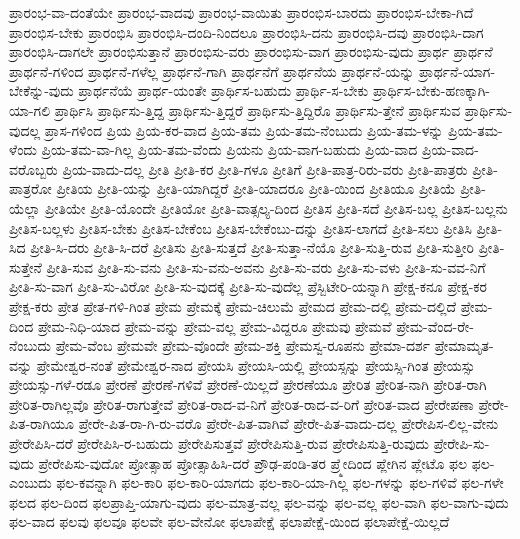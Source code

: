{ಪ್ರಾರಂಭ-ವಾ-ದಂತೆಯೇ
ಪ್ರಾರಂಭ-ವಾದವು
ಪ್ರಾರಂಭ-ವಾಯಿತು
ಪ್ರಾರಂಭಿಸ-ಬಾರದು
ಪ್ರಾರಂಭಿಸ-ಬೇಕಾ-ಗಿದೆ
ಪ್ರಾರಂಭಿಸ-ಬೇಕು
ಪ್ರಾರಂಭಿಸಿ
ಪ್ರಾರಂಭಿಸಿ-ದಂದಿ-ನಿಂದಲೂ
ಪ್ರಾರಂಭಿಸಿ-ದನು
ಪ್ರಾರಂಭಿಸಿ-ದವು
ಪ್ರಾರಂಭಿಸಿ-ದಾಗ
ಪ್ರಾರಂಭಿಸಿ-ದಾಗಲೇ
ಪ್ರಾರಂಭಿಸುತ್ತಾನೆ
ಪ್ರಾರಂಭಿಸು-ವರು
ಪ್ರಾರಂಭಿಸು-ವಾಗ
ಪ್ರಾರಂಭಿಸು-ವುದು
ಪ್ರಾರ್ಥ
ಪ್ರಾರ್ಥನೆ
ಪ್ರಾರ್ಥನೆ-ಗಳಿಂದ
ಪ್ರಾರ್ಥನೆ-ಗಳೆಲ್ಲ
ಪ್ರಾರ್ಥನೆ-ಗಾಗಿ
ಪ್ರಾರ್ಥನೆಗೆ
ಪ್ರಾರ್ಥನೆಯ
ಪ್ರಾರ್ಥನೆ-ಯನ್ನು
ಪ್ರಾರ್ಥನೆ-ಯಾಗ-ಬೇಕೆನ್ನು-ವುದು
ಪ್ರಾರ್ಥನೆಯೆ
ಪ್ರಾರ್ಥ-ಯಂತೇ
ಪ್ರಾರ್ಥಿಸ-ಬಹುದು
ಪ್ರಾರ್ಥಿ-ಸ-ಬೇಕು
ಪ್ರಾರ್ಥಿಸ-ಬೇಕು-ಹಣಕ್ಕಾಗಿ-ಯಾ-ಗಲಿ
ಪ್ರಾರ್ಥಿಸಿ
ಪ್ರಾರ್ಥಿಸು-ತ್ತಿದ್ದ
ಪ್ರಾರ್ಥಿಸು-ತ್ತಿದ್ದರೆ
ಪ್ರಾರ್ಥಿಸು-ತ್ತಿದ್ದಿರೊ
ಪ್ರಾರ್ಥಿಸು-ತ್ತೇನೆ
ಪ್ರಾರ್ಥಿಸುವ
ಪ್ರಾರ್ಥಿಸು-ವುದಲ್ಲ
ಪ್ರಾಸ-ಗಳಿಂದ
ಪ್ರಿಯ
ಪ್ರಿಯ-ಕರ-ವಾದ
ಪ್ರಿಯ-ತಮ
ಪ್ರಿಯ-ತಮ-ನೆಂಬುದು
ಪ್ರಿಯ-ತಮ-ಳನ್ನು
ಪ್ರಿಯ-ತಮ-ಳೆಂದು
ಪ್ರಿಯ-ತಮ-ವಾ-ಗಿಲ್ಲ
ಪ್ರಿಯ-ತಮ-ವೆಂದು
ಪ್ರಿಯನು
ಪ್ರಿಯ-ವಾಗ-ಬಹುದು
ಪ್ರಿಯ-ವಾದ
ಪ್ರಿಯ-ವಾದ-ವರೊಬ್ಬರು
ಪ್ರಿಯ-ವಾದು-ದಲ್ಲ
ಪ್ರೀತಿ
ಪ್ರೀತಿ-ಕರ
ಪ್ರೀತಿ-ಗಳೂ
ಪ್ರೀತಿಗೆ
ಪ್ರೀತಿ-ಪಾತ್ರ-ರಿರು-ವರು
ಪ್ರೀತಿ-ಪಾತ್ರರು
ಪ್ರೀತಿ-ಪಾತ್ರರೋ
ಪ್ರೀತಿಯ
ಪ್ರೀತಿ-ಯನ್ನು
ಪ್ರೀತಿ-ಯಾಗಿದ್ದರೆ
ಪ್ರೀತಿ-ಯಾದರೂ
ಪ್ರೀತಿ-ಯಿಂದ
ಪ್ರೀತಿಯೂ
ಪ್ರೀತಿಯೆ
ಪ್ರೀತಿ-ಯೆಲ್ಲಾ
ಪ್ರೀತಿಯೇ
ಪ್ರೀತಿ-ಯೊಂದೇ
ಪ್ರೀತಿಯೋ
ಪ್ರೀತಿ-ವಾತ್ಸಲ್ಯ-ದಿಂದ
ಪ್ರೀತಿಸ
ಪ್ರೀತಿ-ಸದೆ
ಪ್ರೀತಿಸ-ಬಲ್ಲ
ಪ್ರೀತಿಸ-ಬಲ್ಲನು
ಪ್ರೀತಿಸ-ಬಲ್ಲಳು
ಪ್ರೀತಿಸ-ಬೇಕು
ಪ್ರೀತಿಸ-ಬೇಕೆಂಬ
ಪ್ರೀತಿಸ-ಬೇಕೆಂಬು-ದನ್ನು
ಪ್ರೀತಿಸ-ಲಾಗದೆ
ಪ್ರೀತಿ-ಸಲು
ಪ್ರೀತಿಸಿ
ಪ್ರೀತಿ-ಸಿದ
ಪ್ರೀತಿ-ಸಿ-ದರು
ಪ್ರೀತಿ-ಸಿ-ದರೆ
ಪ್ರೀತಿಸು
ಪ್ರೀತಿ-ಸುತ್ತದೆ
ಪ್ರೀತಿ-ಸುತ್ತಾ-ನೆಯೊ
ಪ್ರೀತಿ-ಸುತ್ತಿ-ರುವ
ಪ್ರೀತಿ-ಸುತ್ತೀರಿ
ಪ್ರೀತಿ-ಸುತ್ತೇನೆ
ಪ್ರೀತಿ-ಸುವ
ಪ್ರೀತಿ-ಸು-ವನು
ಪ್ರೀತಿ-ಸು-ವನು-ಅವನು
ಪ್ರೀತಿ-ಸು-ವರು
ಪ್ರೀತಿ-ಸು-ವಳು
ಪ್ರೀತಿ-ಸು-ವವ-ನಿಗೆ
ಪ್ರೀತಿ-ಸು-ವಾಗ
ಪ್ರೀತಿ-ಸು-ವಿರೋ
ಪ್ರೀತಿ-ಸು-ವುದಕ್ಕೆ
ಪ್ರೀತಿ-ಸು-ವುದೆಲ್ಲ
ಪ್ರೆಸ್ಬಿಟೇರಿ-ಯನ್ನಾಗಿ
ಪ್ರೇಕ್ಷ-ಕನೂ
ಪ್ರೇಕ್ಷ-ಕರ
ಪ್ರೇಕ್ಷ-ಕರು
ಪ್ರೇತ
ಪ್ರೇತ-ಗಳಿ-ಗಿಂತ
ಪ್ರೇಮ
ಪ್ರೇಮಕ್ಕೆ
ಪ್ರೇಮ-ಚಿಲುಮೆ
ಪ್ರೇಮದ
ಪ್ರೇಮ-ದಲ್ಲಿ
ಪ್ರೇಮ-ದಲ್ಲಿದೆ
ಪ್ರೇಮ-ದಿಂದ
ಪ್ರೇಮ-ನಿಧಿ-ಯಾದ
ಪ್ರೇಮ-ವನ್ನು
ಪ್ರೇಮ-ವಲ್ಲ
ಪ್ರೇಮ-ವಿದ್ದರೂ
ಪ್ರೇಮವು
ಪ್ರೇಮವೆ
ಪ್ರೇಮ-ವೆಂದ-ರೇ-ನೆಂಬುದು
ಪ್ರೇಮ-ವೆಂಬ
ಪ್ರೇಮವೇ
ಪ್ರೇಮ-ವೊಂದೇ
ಪ್ರೇಮ-ಶಕ್ತಿ
ಪ್ರೇಮಸ್ವ-ರೂಪನು
ಪ್ರೇಮಾ-ದರ್ಶ
ಪ್ರೇಮಾಮೃತ-ವನ್ನು
ಪ್ರೇಮೇಶ್ವರ-ನಂತೆ
ಪ್ರೇಮೇಶ್ವರ-ನಾದ
ಪ್ರೇಯಸಿ
ಪ್ರೇಯಸಿ-ಯಲ್ಲಿ
ಪ್ರೇಯಸ್ಸನ್ನು
ಪ್ರೇಯಸ್ಸಿ-ಗಿಂತ
ಪ್ರೇಯಸ್ಸು
ಪ್ರೇಯಸ್ಸು-ಗಳೆ-ರಡೂ
ಪ್ರೇರಣೆ
ಪ್ರೇರಣೆ-ಗಳಿವೆ
ಪ್ರೇರಣೆ-ಯಿಲ್ಲದೆ
ಪ್ರೇರಣೆಯೂ
ಪ್ರೇರಿತ
ಪ್ರೇರಿತ-ನಾಗಿ
ಪ್ರೇರಿತ-ರಾಗಿ
ಪ್ರೇರಿತ-ರಾಗಿಲ್ಲವೊ
ಪ್ರೇರಿತ-ರಾಗುತ್ತೇವೆ
ಪ್ರೇರಿತ-ರಾದ-ವ-ನಿಗೆ
ಪ್ರೇರಿತ-ರಾದ-ವ-ರಿಗೆ
ಪ್ರೇರಿತ-ವಾದ
ಪ್ರೇರೇಪಣಾ
ಪ್ರೇರೇ-ಪಿತ-ರಾಗಿಯೂ
ಪ್ರೇರೇ-ಪಿತ-ರಾ-ಗಿ-ರು-ವರೊ
ಪ್ರೇರೇ-ಪಿತ-ವಾಗಿವೆ
ಪ್ರೇರೇ-ಪಿತ-ವಾದು-ದಲ್ಲ
ಪ್ರೇರೇಪಿಸ-ಲಿಲ್ಲ-ವೇನು
ಪ್ರೇರೇಪಿಸಿ-ದರೆ
ಪ್ರೇರೇಪಿಸಿ-ರ-ಬಹುದು
ಪ್ರೇರೇಪಿಸುತ್ತವೆ
ಪ್ರೇರೇಪಿಸುತ್ತಿ-ರುವ
ಪ್ರೇರೇಪಿಸುತ್ತಿ-ರುವುದು
ಪ್ರೇರೇಪಿ-ಸು-ವುದು
ಪ್ರೇರೇಪಿಸು-ವುದೋ
ಪ್ರೋತ್ಸಾಹ
ಪ್ರೋತ್ಸಾಹಿಸಿ-ದರೆ
ಪ್ರೌಢ-ಪಂಡಿ-ತರ
ಪ್ರ್ಮೇದಿಂದ
ಪ್ಲೇಗಿನ
ಪ್ಲೇಟೊ
ಫಲ
ಫಲ-ಎಂಬುದು
ಫಲ-ಕವನ್ನಾಗಿ
ಫಲ-ಕಾರಿ
ಫಲ-ಕಾರಿ-ಯಾಗದು
ಫಲ-ಕಾರಿ-ಯಾ-ಗಿಲ್ಲ
ಫಲ-ಗಳನ್ನು
ಫಲ-ಗಳಿವೆ
ಫಲ-ಗಳೇ
ಫಲದ
ಫಲ-ದಿಂದ
ಫಲಪ್ರಾಪ್ತಿ-ಯಾಗು-ವುದು
ಫಲ-ಮಾತ್ರ-ವಲ್ಲ
ಫಲ-ವನ್ನು
ಫಲ-ವಲ್ಲ
ಫಲ-ವಾಗಿ
ಫಲ-ವಾಗು-ವುದು
ಫಲ-ವಾದ
ಫಲವು
ಫಲವೂ
ಫಲವೇ
ಫಲ-ವೇನೋ
ಫಲಾಪೇಕ್ಷೆ
ಫಲಾಪೇಕ್ಷೆ-ಯಿಂದ
ಫಲಾಪೇಕ್ಷೆ-ಯಿಲ್ಲದೆ
}
